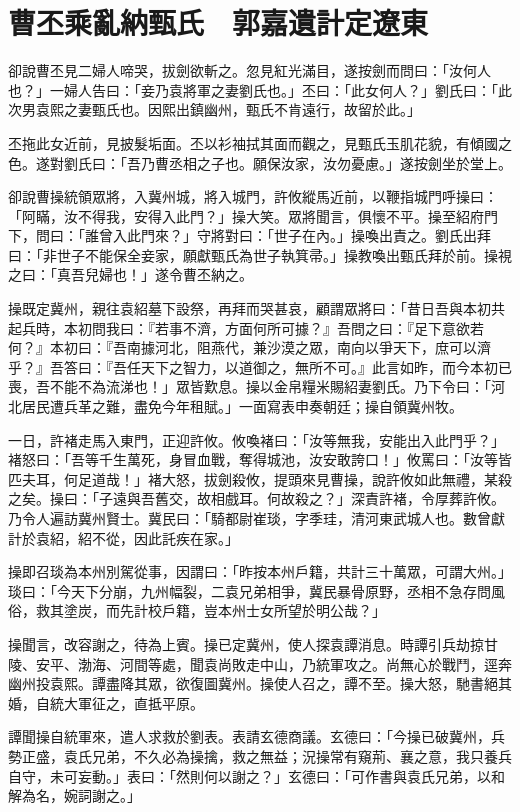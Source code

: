 
\chapter{曹丕乘亂納甄氏　郭嘉遺計定遼東}

卻說曹丕見二婦人啼哭，拔劍欲斬之。忽見紅光滿目，遂按劍而問曰：「汝何人也？」一婦人告曰：「妾乃袁將軍之妻劉氏也。」丕曰：「此女何人？」劉氏曰：「此次男袁熙之妻甄氏也。因熙出鎮幽州，甄氏不肯遠行，故留於此。」

丕拖此女近前，見披髮垢面。丕以衫袖拭其面而觀之，見甄氏玉肌花貌，有傾國之色。遂對劉氏曰：「吾乃曹丞相之子也。願保汝家，汝勿憂慮。」遂按劍坐於堂上。

卻說曹操統領眾將，入冀州城，將入城門，許攸縱馬近前，以鞭指城門呼操曰：「阿瞞，汝不得我，安得入此門？」操大笑。眾將聞言，俱懷不平。操至紹府門下，問曰：「誰曾入此門來？」守將對曰：「世子在內。」操喚出責之。劉氏出拜曰：「非世子不能保全妾家，願獻甄氏為世子執箕帚。」操教喚出甄氏拜於前。操視之曰：「真吾兒婦也！」遂令曹丕納之。

操既定冀州，親往袁紹墓下設祭，再拜而哭甚哀，顧謂眾將曰：「昔日吾與本初共起兵時，本初問我曰：『若事不濟，方面何所可據？』吾問之曰：『足下意欲若何？』本初曰：『吾南據河北，阻燕代，兼沙漠之眾，南向以爭天下，庶可以濟乎？』吾答曰：『吾任天下之智力，以道御之，無所不可。』此言如昨，而今本初已喪，吾不能不為流涕也！」眾皆歎息。操以金帛糧米賜紹妻劉氏。乃下令曰：「河北居民遭兵革之難，盡免今年租賦。」一面寫表申奏朝廷；操自領冀州牧。

一日，許褚走馬入東門，正迎許攸。攸喚褚曰：「汝等無我，安能出入此門乎？」褚怒曰：「吾等千生萬死，身冒血戰，奪得城池，汝安敢誇口！」攸罵曰：「汝等皆匹夫耳，何足道哉！」褚大怒，拔劍殺攸，提頭來見曹操，說許攸如此無禮，某殺之矣。操曰：「子遠與吾舊交，故相戲耳。何故殺之？」深責許褚，令厚葬許攸。乃令人遍訪冀州賢士。冀民曰：「騎都尉崔琰，字季珪，清河東武城人也。數曾獻計於袁紹，紹不從，因此託疾在家。」

操即召琰為本州別駕從事，因謂曰：「昨按本州戶籍，共計三十萬眾，可謂大州。」琰曰：「今天下分崩，九州幅裂，二袁兄弟相爭，冀民暴骨原野，丞相不急存問風俗，救其塗炭，而先計校戶籍，豈本州士女所望於明公哉？」

操聞言，改容謝之，待為上賓。操已定冀州，使人探袁譚消息。時譚引兵劫掠甘陵、安平、渤海、河間等處，聞袁尚敗走中山，乃統軍攻之。尚無心於戰鬥，逕奔幽州投袁熙。譚盡降其眾，欲復圖冀州。操使人召之，譚不至。操大怒，馳書絕其婚，自統大軍征之，直抵平原。

譚聞操自統軍來，遣人求救於劉表。表請玄德商議。玄德曰：「今操已破冀州，兵勢正盛，袁氏兄弟，不久必為操擒，救之無益；況操常有窺荊、襄之意，我只養兵自守，未可妄動。」表曰：「然則何以謝之？」玄德曰：「可作書與袁氏兄弟，以和解為名，婉詞謝之。」


